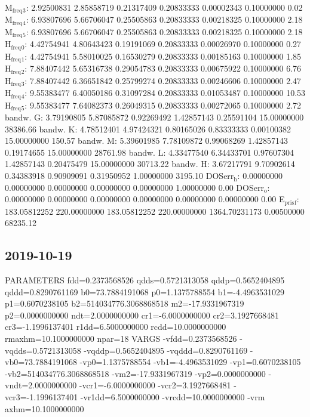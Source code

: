 \documentclass[11pt]{article}
\begin{document}
M\(_{\text{freq}}\)\(_{\text{3}}\):   2.92500831   2.85858719   0.21317409   0.20833333   0.00002343   0.10000000         0.02
M\(_{\text{freq}}\)\(_{\text{4}}\):   6.93807696   5.66706047   0.25505863   0.20833333   0.00218325   0.10000000         2.18
M\(_{\text{freq}}\)\(_{\text{5}}\):   6.93807696   5.66706047   0.25505863   0.20833333   0.00218325   0.10000000         2.18
H\(_{\text{freq}}\)\(_{\text{0}}\):   4.42754941   4.80643423   0.19191069   0.20833333   0.00026970   0.10000000         0.27
H\(_{\text{freq}}\)\(_{\text{1}}\):   4.42754941   5.58010025   0.16530279   0.20833333   0.00185163   0.10000000         1.85
H\(_{\text{freq}}\)\(_{\text{2}}\):   7.88407442   5.65316738   0.29054783   0.20833333   0.00675922   0.10000000         6.76
H\(_{\text{freq}}\)\(_{\text{3}}\):   7.88407442   6.36651842   0.25799274   0.20833333   0.00246606   0.10000000         2.47
H\(_{\text{freq}}\)\(_{\text{4}}\):   9.55383477   6.40050186   0.31097284   0.20833333   0.01053487   0.10000000        10.53
H\(_{\text{freq}}\)\(_{\text{5}}\):   9.55383477   7.64082373   0.26049315   0.20833333   0.00272065   0.10000000         2.72
bandw. G:   3.79190805   5.87085872   0.92269492   1.42857143   0.25591104  15.00000000     38386.66
bandw. K:   4.78512401   4.97424321   0.80165026   0.83333333   0.00100382  15.00000000       150.57
bandw. M:   5.39601985   7.78109872   0.99068269   1.42857143   0.19174655  15.00000000     28761.98
bandw. L:   4.33477540   6.34433701   0.97607304   1.42857143   0.20475479  15.00000000     30713.22
bandw. H:   3.67217791   9.70902614   0.34383918   0.90909091   0.31950952   1.00000000      3195.10
DOSerr\(_{\text{h}}\):   0.00000000   0.00000000   0.00000000   0.00000000   0.00000000   1.00000000         0.00
DOSerr\(_{\text{o}}\):   0.00000000   0.00000000   0.00000000   0.00000000   0.00000000   0.00000000         0.00
E\(_{\text{pris}}\)\(_{\text{f}}\): 183.05812252 220.00000000 183.05812252 220.00000000 1364.70231173   0.00500000     68235.12


\subsection{2019-10-19}
\label{sec:orgaf79e0b}



PARAMETERS
  fdd=0.2373568526 qdds=0.5721313058 qddp=0.5652404895 qddd=0.8290761169 b0=73.7884191068 p0=1.1375788554 b1=-4.4963531029 p1=0.6070238105 b2=514034776.3068868518 m2=-17.9331967319 p2=0.0000000000 ndt=2.0000000000 cr1=-6.0000000000 cr2=3.1927668481 cr3=-1.1996137401 r1dd=6.5000000000 rcdd=10.0000000000 rmaxhm=10.1000000000 npar=18 
VARGS
    -vfdd=0.2373568526 -vqdds=0.5721313058 -vqddp=0.5652404895 -vqddd=0.8290761169 -vb0=73.7884191068 -vp0=1.1375788554 -vb1=-4.4963531029 -vp1=0.6070238105 -vb2=514034776.3068868518 -vm2=-17.9331967319 -vp2=0.0000000000 -vndt=2.0000000000 -vcr1=-6.0000000000 -vcr2=3.1927668481 -vcr3=-1.1996137401 -vr1dd=6.5000000000 -vrcdd=10.0000000000 -vrm
axhm=10.1000000000 
\end{document}
